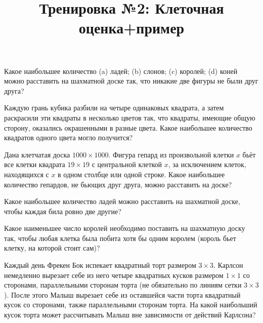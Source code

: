 



\title{Тренировка №2: Клеточная оценка+пример}
\maketitle

\begin{problem}
	Какое наибольшее количество (a) ладей; (b) слонов; (c) королей; (d) коней можно расставить на шахматной доске так, что никакие две фигуры не были друг друга?
\end{problem}

\begin{problem}
	Каждую грань кубика разбили на четыре одинаковых квадрата, а затем раскрасили эти квадраты в несколько цветов так, что квадраты, имеющие общую сторону, оказались окрашенными в разные цвета. Какое наибольшее количество квадратов одного цвета могло получится?
\end{problem}

\begin{problem}
	Дана клетчатая доска $1000 \times 1000$. Фигура гепард из произвольной клетки $x$ бьёт все клетки квадрата $19 \times 19$ с центральной клеткой $x$, за исключением клеток, находящихся с $x$ в одном столбце или одной строке. Какое наибольшее количество гепардов, не бьющих друг друга, можно расставить на доске?
\end{problem}

\begin{problem}
	Какое наибольшее количество ладей можно расставить на шахматной доске, чтобы каждая била ровно две другие?
\end{problem}

\begin{problem}
	Какое наименьшее число королей необходимо поставить на шахматную доску так, чтобы любая клетка была побита хотя бы одним королем (король бьет клетку, на которой стоит сам)?
\end{problem}

\begin{problem}
	Каждый день Фрекен Бок испекает квадратный торт размером $3 \times 3$. Карлсон немедленно вырезает себе из него четыре квадратных кусков размером $1 \times 1$ со сторонами, параллельными сторонам торта (не обязательно по линиям сетки $3 \times 3$). После этого Малыш вырезает себе из оставшейся части торта квадратный кусок со сторонами, также параллельными сторонам торта. На какой наибольший кусок торта может рассчитывать Малыш вне зависимости от действий Карлсона?
\end{problem}

